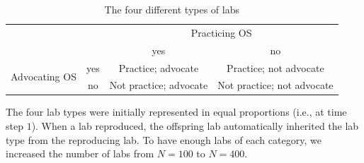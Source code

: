 \documentclass[meta, authordate]{jote-new-article}
\begin{document}
%
%
\begin{table}[]
  \centering
  \begin{fullwidth}

    \centering
    \caption{The four different types of labs}
    \label{tab:labtypes}
    \begin{tabular}{c c | c c}
                                     &     & \multicolumn{2}{c}{Practicing OS}                              \\
                                     &     & yes                               & no                         \\
      \hline
      \multirow{2}{*}{Advocating OS} & yes & Practice; advocate                & Practice; not advocate     \\
                                     & no  & Not practice; advocate            & Not practice; not advocate \\
    \end{tabular}
  \end{fullwidth}
\end{table}
%

The four lab types were initially represented in equal proportions (i.e., at time step $1$). When a lab reproduced, the offspring lab automatically inherited the lab type from the reproducing lab. To have enough labs of each category, we increased the number of labs from $N=100$ to $N=400$.
\end{document}
